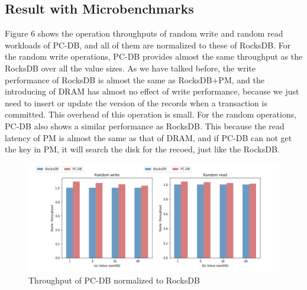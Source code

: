 \subsection{Result with Microbenchmarks}
Figure 6 shows the operation throughputs of random write and random read workloads of PC-DB, and all of them are normalized to these of RocksDB.
For the random write operations, PC-DB provides almost the same throughput as the RocksDB over all the value sizes. As we have talked before, the write performance of RocksDB is almost the same as RocksDB+PM, and the introducing of DRAM has almost no effect of write performance, because we just need to insert or update the version of the records when a transaction is committed. This overhead of this operation is small. 
For the random operations, PC-DB also shows a similar performance as RocksDB. This because the read latency of PM is almost the same as that of DRAM, and if PC-DB can not get the key in PM, it will search the disk for the recoed, just like the RocksDB.
\begin{figure}
    \centering
    \includegraphics[width=0.36\paperwidth]{figure/Throughput.png}
    \caption{Throughput of PC-DB normalized to RocksDB}
    \label{fig:throughput}
\end{figure}
